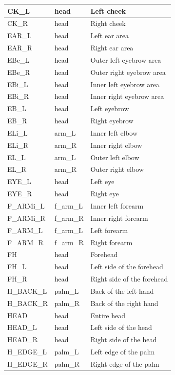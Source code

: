 \documentclass[../main.tex]{subfiles}
\begin{document}
\begin{longtable}{|p{2cm}|p{3cm}|p{5cm}|}
    CK\_L & head & Left cheek \\ \hline
    CK\_R & head & Right cheek \\ \hline
    EAR\_L & head & Left ear area \\ \hline
    EAR\_R & head & Right ear area \\ \hline
    EBe\_L & head & Outer left eyebrow area \\ \hline
    EBe\_R & head & Outer right eyebrow area \\ \hline
    EBi\_L & head & Inner left eyebrow area \\ \hline
    EBi\_R & head & Inner right eyebrow area \\ \hline
    EB\_L & head & Left eyebrow \\ \hline
    EB\_R & head & Right eyebrow \\ \hline
    ELi\_L & arm\_L & Inner left elbow \\ \hline
    ELi\_R & arm\_R & Inner right elbow \\ \hline
    EL\_L & arm\_L & Outer left elbow \\ \hline
    EL\_R & arm\_R & Outer right elbow \\ \hline
    EYE\_L & head & Left eye \\ \hline
    EYE\_R & head & Right eye \\ \hline
    F\_ARMi\_L & f\_arm\_L & Inner left forearm \\ \hline
    F\_ARMi\_R & f\_arm\_R & Inner right forearm \\ \hline
    F\_ARM\_L & f\_arm\_L & Left forearm \\ \hline
    F\_ARM\_R & f\_arm\_R & Right forearm \\ \hline
    FH & head & Forehead \\ \hline
    FH\_L & head & Left side of the forehead \\ \hline
    FH\_R & head & Right side of the forehead \\ \hline
    H\_BACK\_L & palm\_L & Back of the left hand \\ \hline
    H\_BACK\_R & palm\_R & Back of the right hand \\ \hline
    HEAD & head & Entire head \\ \hline
    HEAD\_L & head & Left side of the head \\ \hline
    HEAD\_R & head & Right side of the head \\ \hline
    H\_EDGE\_L & palm\_L & Left edge of the palm \\ \hline
    H\_EDGE\_R & palm\_R & Right edge of the palm \\ \hline

\end{longtable}
\end{document}
